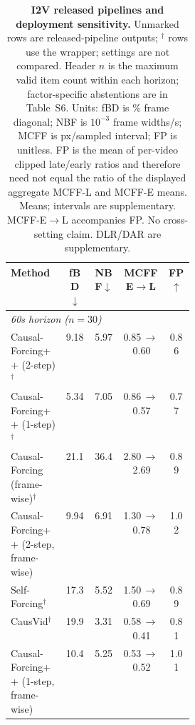 \begin{table}[!tb]
\centering
\scriptsize
\setlength{\tabcolsep}{2.6pt}
\begin{tabular}{p{0.30\linewidth}cccc}
\toprule
Method & fBD$\downarrow$ & NBF$\downarrow$ & MCFF E$\rightarrow$L & FP$\uparrow$ \\
\midrule
\multicolumn{5}{l}{\textit{60s horizon  ($n=30$)}} \\
Causal-Forcing++ (2-step)$^{\dagger}$ & 9.18 & 5.97 & 0.85\,$\rightarrow$\,0.60 & 0.86 \\
Causal-Forcing++ (1-step)$^{\dagger}$ & 5.34 & 7.05 & 0.86\,$\rightarrow$\,0.57 & 0.77 \\
Causal-Forcing (frame-wise)$^{\dagger}$ & 21.1 & 36.4 & 2.80\,$\rightarrow$\,2.69 & 0.89 \\
Causal-Forcing++ (2-step, frame-wise) & 9.94 & 6.91 & 1.30\,$\rightarrow$\,0.78 & 1.02 \\
Self-Forcing$^{\dagger}$ & 17.3 & 5.52 & 1.50\,$\rightarrow$\,0.69 & 0.89 \\
CausVid$^{\dagger}$ & 19.9 & 3.31 & 0.58\,$\rightarrow$\,0.41 & 0.81 \\
Causal-Forcing++ (1-step, frame-wise) & 10.4 & 5.25 & 0.53\,$\rightarrow$\,0.52 & 1.01 \\
\bottomrule
\end{tabular}
\caption{\textbf{I2V released pipelines and deployment sensitivity.} Unmarked rows are released-pipeline outputs; $^{\dagger}$ rows use the wrapper; settings are not compared. Header $n$ is the maximum valid item count within each horizon; factor-specific abstentions are in Table~S6. Units: fBD is \% frame diagonal; NBF is $10^{-3}$ frame widths/s; MCFF is px/sampled interval; FP is unitless. FP is the mean of per-video clipped late/early ratios and therefore need not equal the ratio of the displayed aggregate MCFF-L and MCFF-E means. Means; intervals are supplementary. MCFF-E$\rightarrow$L accompanies FP. No cross-setting claim. DLR/DAR are supplementary.}
\label{tab:i2v_audit}
\end{table}